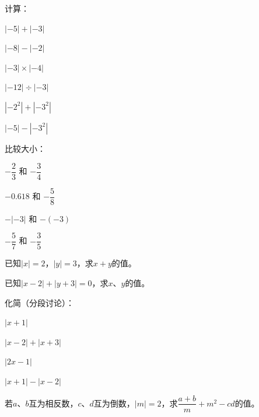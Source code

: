 \documentclass[a4paper,12pt]{ctexart}
\begin{document}
\begin{exercise}
\item 计算：
  \begin{subexercise}
    \item $|{-5}|+|{-3}|$
    \item $|{-8}|-|{-2}|$
    \item $|{-3}|\times|{-4}|$
    \item $|{-12}|\div|{-3}|$
    \item $|-2^2|+|-3^2|$
    \item $|-5|-|{-3}^2|$
  \end{subexercise}

\item 比较大小：
  \begin{subexercise}
    \item $-\dfrac{2}{3}$ 和 $-\dfrac{3}{4}$
    \item $-0.618$ 和 $-\dfrac{5}{8}$
    \item $-|{-3}|$ 和 $-(-3)$
    \item $-\dfrac{5}{7}$ 和 $-\dfrac{3}{5}$
  \end{subexercise}

\item 已知$|x|=2$，$|y|=3$，求$x+y$的值。

\item 已知$|x-2|+|y+3|=0$，求$x$、$y$的值。

\item 化简（分段讨论）：
  \begin{subexercise}
    \item $|x+1|$
    \item $|x-2|+|x+3|$
    \item $|2x-1|$
    \item $|x+1|-|x-2|$
  \end{subexercise}

\item 若$a$、$b$互为相反数，$c$、$d$互为倒数，$|m|=2$，求$\dfrac{a+b}{m}+m^2-cd$的值。
\end{exercise}

\newpage


\end{document}
